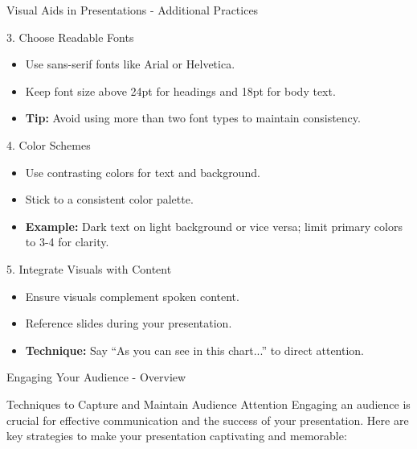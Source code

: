 \documentclass[aspectratio=169]{beamer}
\begin{document}
\begin{frame}[fragile]{Visual Aids in Presentations - Additional Practices}
    \begin{block}{3. Choose Readable Fonts}
        \begin{itemize}
            \item Use sans-serif fonts like Arial or Helvetica.
            \item Keep font size above 24pt for headings and 18pt for body text.
            \item \textbf{Tip:} Avoid using more than two font types to maintain consistency.
        \end{itemize}
    \end{block}
    
    \begin{block}{4. Color Schemes}
        \begin{itemize}
            \item Use contrasting colors for text and background.
            \item Stick to a consistent color palette.
            \item \textbf{Example:} Dark text on light background or vice versa; limit primary colors to 3-4 for clarity.
        \end{itemize}
    \end{block}
    
    \begin{block}{5. Integrate Visuals with Content}
        \begin{itemize}
            \item Ensure visuals complement spoken content.
            \item Reference slides during your presentation.
            \item \textbf{Technique:} Say “As you can see in this chart...” to direct attention.
        \end{itemize}
    \end{block}
\end{frame}

\begin{frame}[fragile]{Engaging Your Audience - Overview}
    \begin{block}{Techniques to Capture and Maintain Audience Attention}
        Engaging an audience is crucial for effective communication and the success of your presentation. Here are key strategies to make your presentation captivating and memorable:
    \end{block}
\end{frame}
\end{document}

